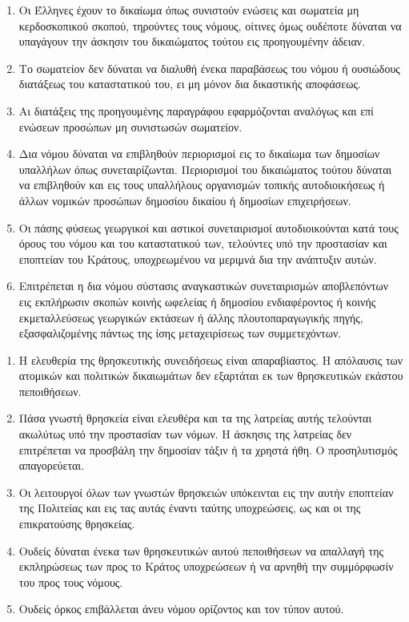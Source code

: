 \documentclass[twoside, a4paper, 10pt]{article}
\begin{document}
\begin{multicols}{2}
\begin{enumerate}
\begin{BigQuote}
\begin{enumerate}
  \item[1.] Οι Έλληνες έχουν το δικαίωμα όπως συνιστούν ενώσεις και σωματεία μη κερδοσκοπικού σκοπού, τηρούντες τους νόμους, οίτινες όμως ουδέποτε δύναται να υπαγάγουν την άσκησιν του δικαιώματος τούτου εις προηγουμένην άδειαν.
  \item[2.] Το σωματείον δεν δύναται να διαλυθή ένεκα παραβάσεως του νόμου ή ουσιώδους διατάξεως του καταστατικού του, ει μη μόνον δια δικαστικής αποφάσεως.
  \item[3.] Αι διατάξεις της προηγουμένης παραγράφου εφαρμόζονται αναλόγως και επί ενώσεων προσώπων μη συνιστωσών σωματείον.
  \item[4.] Δια νόμου δύναται να επιβληθούν περιορισμοί εις το δικαίωμα των δημοσίων υπαλλήλων όπως συνεταιρίζωνται. Περιορισμοί του δικαιώματος τούτου δύναται  να επιβληθούν και εις τους υπαλλήλους οργανισμών τοπικής αυτοδιοικήσεως  ή άλλων νομικών προσώπων δημοσίου δικαίου ή δημοσίων επιχειρήσεων.
  \item[5.] Οι πάσης φύσεως γεωργικοί και αστικοί συνεταιρισμοί αυτοδιοικούνται κατά τους όρους του νόμου και του καταστατικού των, τελούντες υπό την προστασίαν και εποπτείαν του Κράτους, υποχρεωμένου να μεριμνά δια την ανάπτυξιν αυτών.
  \item[6.] Επιτρέπεται η δια νόμου σύστασις αναγκαστικών συνεταιρισμών αποβλεπόντων εις εκπλήρωσιν σκοπών κοινής ωφελείας ή δημοσίου ενδιαφέροντος ή κοινής εκμεταλλεύσεως γεωργικών εκτάσεων ή άλλης πλουτοπαραγωγικής πηγής, εξασφαλιζομένης πάντως της ίσης μεταχειρίσεως των συμμετεχόντων.
\end{enumerate}

\begin{enumerate}
  \item[1.] Η ελευθερία της θρησκευτικής συνειδήσεως είναι απαραβίαστος. Η απόλαυσις των ατομικών και πολιτικών δικαιωμάτων δεν εξαρτάται εκ των θρησκευτικών εκάστου πεποιθήσεων.
  \item[2.] Πάσα γνωστή θρησκεία είναι ελευθέρα και τα της λατρείας αυτής τελούνται ακωλύτως υπό την προστασίαν των νόμων. Η άσκησις της λατρείας δεν επιτρέπεται να προσβάλη την δημοσίαν τάξιν ή τα χρηστά ήθη. Ο προσηλυτισμός απαγορεύεται.
  \item[3.] Οι λειτουργοί όλων των γνωστών θρησκειών υπόκεινται εις την αυτήν εποπτείαν της Πολιτείας και εις τας αυτάς έναντι ταύτης υποχρεώσεις, ως και οι της επικρατούσης θρησκείας.
  \item[4.] Ουδείς δύναται ένεκα των θρησκευτικών αυτού πεποιθήσεων να απαλλαγή της εκπληρώσεως των προς το Κράτος υποχρεώσεων ή να αρνηθή την συμμόρφωσίν του προς τους νόμους.
  \item[5.] Ουδείς όρκος επιβάλλεται άνευ νόμου ορίζοντος και τον τύπον αυτού.
\end{enumerate}


\end{BigQuote}
\end{enumerate}
\end{multicols}
\end{document}
